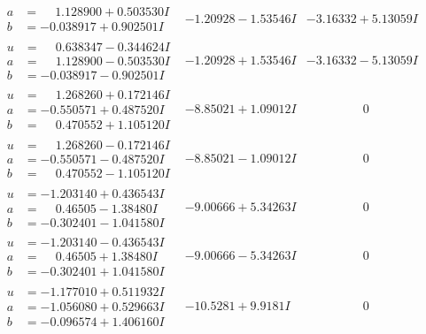\documentclass[1p]{elsarticle_modified}
\theoremstyle{definition}
\begin{document}
$$\begin{array}{c|c|c}
\begin{aligned}
a &= \phantom{-}1.128900 + 0.503530 I \\
b &= -0.038917 + 0.902501 I\end{aligned}
 & -1.20928 - 1.53546 I & -3.16332 + 5.13059 I \\ \hline\begin{aligned}
u &= \phantom{-}0.638347 - 0.344624 I \\
a &= \phantom{-}1.128900 - 0.503530 I \\
b &= -0.038917 - 0.902501 I\end{aligned}
 & -1.20928 + 1.53546 I & -3.16332 - 5.13059 I \\ \hline\begin{aligned}
u &= \phantom{-}1.268260 + 0.172146 I \\
a &= -0.550571 + 0.487520 I \\
b &= \phantom{-}0.470552 + 1.105120 I\end{aligned}
 & -8.85021 + 1.09012 I & \phantom{-0.000000 } 0 \\ \hline\begin{aligned}
u &= \phantom{-}1.268260 - 0.172146 I \\
a &= -0.550571 - 0.487520 I \\
b &= \phantom{-}0.470552 - 1.105120 I\end{aligned}
 & -8.85021 - 1.09012 I & \phantom{-0.000000 } 0 \\ \hline\begin{aligned}
u &= -1.203140 + 0.436543 I \\
a &= \phantom{-}0.46505 - 1.38480 I \\
b &= -0.302401 - 1.041580 I\end{aligned}
 & -9.00666 + 5.34263 I & \phantom{-0.000000 } 0 \\ \hline\begin{aligned}
u &= -1.203140 - 0.436543 I \\
a &= \phantom{-}0.46505 + 1.38480 I \\
b &= -0.302401 + 1.041580 I\end{aligned}
 & -9.00666 - 5.34263 I & \phantom{-0.000000 } 0 \\ \hline\begin{aligned}
u &= -1.177010 + 0.511932 I \\
a &= -1.056080 + 0.529663 I \\
b &= -0.096574 + 1.406160 I\end{aligned}
 & -10.5281 + 9.9181 I & \phantom{-0.000000 } 0 \\ \hline\begin{aligned}

\end{aligned}
\end{array}$$
\end{document}
